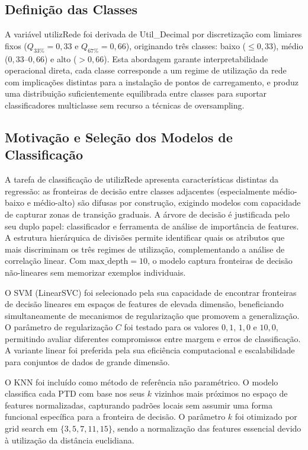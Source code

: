 \documentclass[conference]{IEEEtran}
\begin{document}
\subsection{Definição das Classes}

A variável utilizRede foi derivada de Util\_Decimal por discretização com limiares fixos ($Q_{33\%} = 0{,}33$ e $Q_{67\%} = 0{,}66$), originando três classes: baixo ($\leq 0{,}33$), médio ($0{,}33$--$0{,}66$) e alto ($> 0{,}66$). Esta abordagem garante interpretabilidade operacional direta, cada classe corresponde a um regime de utilização da rede com implicações distintas para a instalação de pontos de carregamento, e produz uma distribuição suficientemente equilibrada entre classes para suportar classificadores multiclasse sem recurso a técnicas de oversampling.

\subsection{Motivação e Seleção dos Modelos de Classificação}

A tarefa de classificação de utilizRede apresenta características distintas da regressão: as fronteiras de decisão entre classes adjacentes (especialmente médio-baixo e médio-alto) são difusas por construção, exigindo modelos com capacidade de capturar zonas de transição graduais. A árvore de decisão é justificada pelo seu duplo papel: classificador e ferramenta de análise de importância de features. A estrutura hierárquica de divisões permite identificar quais os atributos que mais discriminam os três regimes de utilização, complementando a análise de correlação linear. Com $\mathrm{max\_depth} = 10$, o modelo captura fronteiras de decisão não-lineares sem memorizar exemplos individuais.

O SVM (LinearSVC) foi selecionado pela sua capacidade de encontrar fronteiras de decisão lineares em espaços de features de elevada dimensão, beneficiando simultaneamente de mecanismos de regularização que promovem a generalização. O parâmetro de regularização $C$ foi testado para os valores $0{,}1$, $1{,}0$ e $10{,}0$, permitindo avaliar diferentes compromissos entre margem e erros de classificação. A variante linear foi preferida pela sua eficiência computacional e escalabilidade para conjuntos de dados de grande dimensão.

O KNN foi incluído como método de referência não paramétrico. O modelo classifica cada PTD com base nos seus $k$ vizinhos mais próximos no espaço de features normalizadas, capturando padrões locais sem assumir uma forma funcional específica para a fronteira de decisão. O parâmetro $k$ foi otimizado por grid search em $\{3,5,7,11,15\}$, sendo a normalização das features essencial devido à utilização da distância euclidiana.
\end{document}
